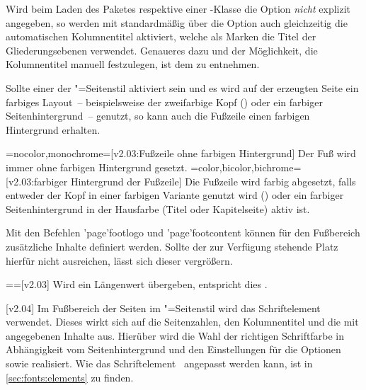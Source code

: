 \begin{DeclareEntity*}{}
\begin{DeclareEntity*}{}
\begin{DeclareEntity*}{}
\begin{Declaration}
Wird beim Laden des Paketes  respektive einer 
\TUDScript-Klasse die Option  
\emph{nicht} explizit angegeben, so werden mit  
standardmäßig über die Option  auch 
gleichzeitig die automatischen Kolumnentitel aktiviert, welche als Marken die 
Titel der Gliederungsebenen verwendet. Genaueres dazu und der Möglichkeit, die 
Kolumnentitel manuell festzulegen, ist dem \scrguide zu entnehmen.

Sollte einer der "=Seitenstil aktiviert sein und es wird 
auf der erzeugten Seite ein farbiges Layout~--  beispielsweise der zweifarbige 
Kopf () oder ein farbiger Seitenhintergrund~-- genutzt, 
so kann auch die Fußzeile einen farbigen Hintergrund erhalten.
\begin{DeclareValues}
\itemval=nocolor,monochrome=[v2.03:Fußzeile ohne farbigen Hintergrund]
  Der Fuß wird immer ohne farbigen Hintergrund gesetzt.
\itemval=color,bicolor,bichrome=[v2.03:farbiger Hintergrund der Fußzeile]
  Die Fußzeile wird farbig abgesetzt, falls entweder der Kopf in einer farbigen
  Variante genutzt wird () oder ein 
  farbiger Seitenhintergrund in der Hausfarbe (Titel oder Kapitelseite) aktiv 
  ist.
\end{DeclareValues}

Mit den Befehlen \Macro'page'{footlogo} und \Macro'page'{footcontent} können 
für den Fußbereich zusätzliche Inhalte definiert werden. Sollte der zur 
Verfügung stehende Platz hierfür nicht ausreichen, lässt sich dieser vergrößern.
\begin{DeclareValues}
\itemval=\PLength=[v2.03]
  Wird ein Längenwert übergeben, entspricht dies 
  .
\end{DeclareValues}
\end{Declaration}

\begin{Declaration}
  {}
  [v2.04]
Im Fußbereich der Seiten im "=Seitenstil wird das 
Schriftelement~ verwendet. Dieses wirkt sich auf die 
Seitenzahlen, den Kolumnentitel und die mit  angegebenen 
Inhalte aus. Hierüber wird die Wahl der richtigen Schriftfarbe in Abhängigkeit 
vom Seitenhintergrund und den Einstellungen für die Optionen  
sowie  realisiert. Wie das Schriftelement~ 
angepasst werden kann, ist in \autoref{sec:fonts:elements} zu finden.
\end{Declaration}


\end{DeclareEntity*}
\end{DeclareEntity*}
\end{DeclareEntity*}
